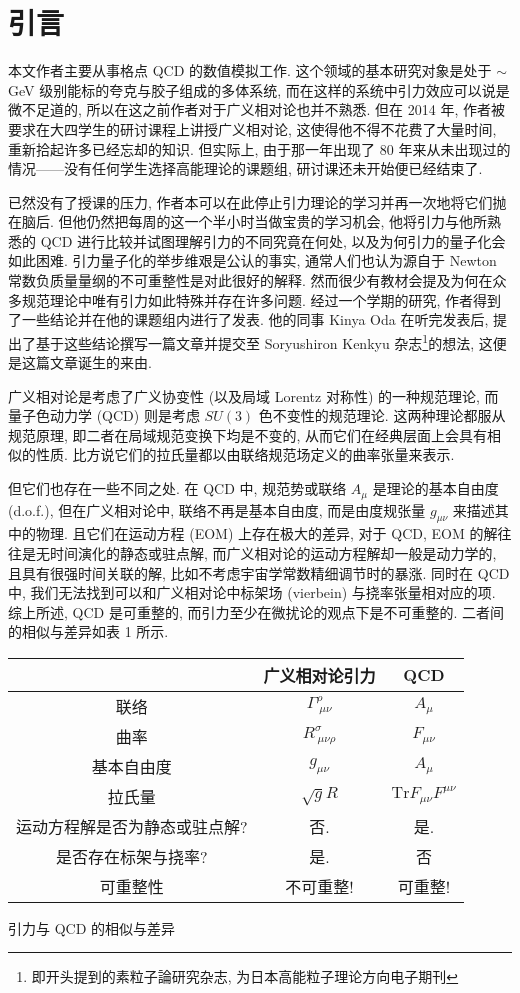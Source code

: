 \documentclass{article}
\begin{document}
\section{引言}
本文作者主要从事格点 QCD 的数值模拟工作. 这个领域的基本研究对象是处于 $\sim$GeV 级别能标的夸克与胶子组成的多体系统, 而在这样的系统中引力效应可以说是微不足道的, 所以在这之前作者对于广义相对论也并不熟悉. 但在 2014 年, 作者被要求在大四学生的研讨课程上讲授广义相对论, 这使得他不得不花费了大量时间, 重新拾起许多已经忘却的知识. 但实际上, 由于那一年出现了 80 年来从未出现过的情况——没有任何学生选择高能理论的课题组, 研讨课还未开始便已经结束了.
\par
已然没有了授课的压力, 作者本可以在此停止引力理论的学习并再一次地将它们抛在脑后. 但他仍然把每周的这一个半小时当做宝贵的学习机会, 他将引力与他所熟悉的 QCD 进行比较并试图理解引力的不同究竟在何处, 以及为何引力的量子化会如此困难. 引力量子化的举步维艰是公认的事实, 通常人们也认为源自于 Newton 常数负质量量纲的不可重整性是对此很好的解释. 然而很少有教材会提及为何在众多规范理论中唯有引力如此特殊并存在许多问题. 经过一个学期的研究, 作者得到了一些结论并在他的课题组内进行了发表. 他的同事 Kinya Oda 在听完发表后, 提出了基于这些结论撰写一篇文章并提交至 Soryushiron Kenkyu 杂志\footnote{即开头提到的素粒子論研究杂志, 为日本高能粒子理论方向电子期刊}的想法, 这便是这篇文章诞生的来由.
\par
广义相对论是考虑了广义协变性 (以及局域 Lorentz 对称性) 的一种规范理论, 而量子色动力学 (QCD) 则是考虑 $SU(3)$ 色不变性的规范理论. 这两种理论都服从规范原理, 即二者在局域规范变换下均是不变的, 从而它们在经典层面上会具有相似的性质. 比方说它们的拉氏量都以由联络规范场定义的曲率张量来表示.
\par
但它们也存在一些不同之处. 在 QCD 中, 规范势或联络 $A_{\mu}$ 是理论的基本自由度 (d.o.f.), 但在广义相对论中, 联络不再是基本自由度, 而是由度规张量 $g_{\mu\nu}$ 来描述其中的物理. 且它们在运动方程 (EOM) 上存在极大的差异, 对于 QCD, EOM 的解往往是无时间演化的静态或驻点解, 而广义相对论的运动方程解却一般是动力学的, 且具有很强时间关联的解, 比如不考虑宇宙学常数精细调节时的暴涨. 同时在 QCD 中, 我们无法找到可以和广义相对论中标架场 (vierbein) 与挠率张量相对应的项. 综上所述, QCD 是可重整的, 而引力至少在微扰论的观点下是不可重整的. 二者间的相似与差异如表 1 所示.
\begin{center}
\begin{tabular}{|c|c|c|}
  \hline
   & 广义相对论引力 & QCD \\
   \hline
  联络 & $\Gamma^{\rho}_{\ \mu\nu}$ & $A_{\mu}$ \\
  曲率 & $R^{\sigma}_{\ \mu\nu\rho}$ & $F_{\mu\nu}$ \\
  基本自由度 & $g_{\mu\nu}$ & $A_{\mu}$ \\
  拉氏量 & $\sqrt{g}R$ & $\textrm{Tr}{F_{\mu\nu}F^{\mu\nu}}$ \\
  运动方程解是否为静态或驻点解? & 否. & 是. \\
  是否存在标架与挠率? & 是. & 否 \\
  可重整性 & 不可重整! & 可重整! \\
  \hline
\end{tabular}
\caption{引力与 QCD 的相似与差异}
\end{center}
\end{document}
